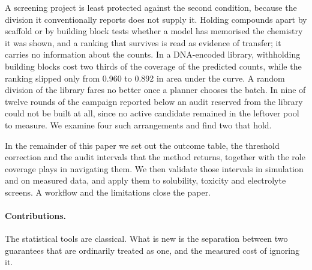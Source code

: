 \documentclass[twocolumn,10pt]{article}
\begin{document}
A screening project is least protected against the second condition, because the division it
conventionally reports does not supply it. Holding compounds apart by scaffold or by building
block tests whether a model has memorised the chemistry it was shown, and a ranking that survives
is read as evidence of transfer; it carries no information about the counts. In a DNA-encoded
library, withholding building blocks cost two thirds of the coverage of the predicted counts,
while the ranking slipped only from 0.960 to 0.892 in area under the curve. A random division of
the library fares no better once a planner chooses the batch. In nine of twelve rounds of the
campaign reported below an audit reserved from the library could not be built at all, since no
active candidate remained in the leftover pool to measure. We examine four such arrangements and
find two that hold.

In the remainder of this paper we set out the outcome table, the threshold correction and the
audit intervals that the method returns, together with the role coverage plays in navigating
them. We then validate those intervals in simulation and on measured data, and apply them to
solubility, toxicity and electrolyte screens. A workflow and the limitations close the paper.

\paragraph{Contributions.} The statistical tools are classical. What is new is the separation
between two guarantees that are ordinarily treated as one, and the measured cost of ignoring it.
\end{document}
